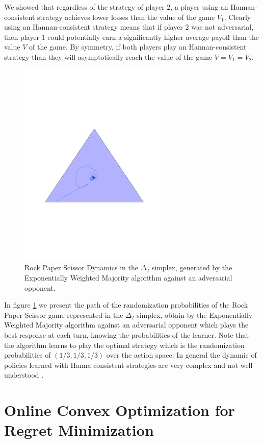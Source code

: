 We showed that regardless of the strategy of player $2$, a player using an Hannan-consistent strategy achieves lower losses than the value of the game $V_1$. Clearly using an Hannan-consistent strategy means that if player $2$ was not adversarial, then player $1$ could potentially earn a significantly higher average payoff than the value $V$ of the game. By symmetry, if both players play an Hannan-consistent strategy than they will asymptotically reach the value of the game $V=V_1=V_2$.

\begin{figure}[ht!]
    \centering
    \includegraphics[width=7cm]{./img/rps_ewm.pdf}
\caption{Rock Paper Scissor Dynamics in the $\Delta_2$ simplex, generated by the Exponentially Weighted Majority algorithm against an adversarial opponent.}
\label{fig:RPS}
\end{figure}

In figure \ref{fig:RPS} we present the path of the randomization probabilities of the Rock Paper Scissor game represented in the $\Delta_{2}$ simplex, obtain by the Exponentially Weighted Majority algorithm against an adversarial opponent which plays the best response at each turn, knowing the probabilities of the learner.
Note that the algorithm learns to play the optimal strategy which is the randomization probabilities of $(1/3,1/3,1/3)$ over the action space. 
In general the dynamic of policies learned with Hanna consistent strategies are very complex and not well understood \cite{bailey2018multiplicative}.

\section{Online Convex Optimization for Regret Minimization}\label{sec:OCO}

